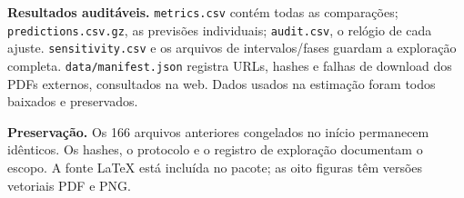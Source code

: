 \documentclass[11pt,a4paper]{article}
\begin{document}
\textbf{Resultados auditáveis.} \texttt{metrics.csv} contém todas as comparações; \texttt{predictions.csv.gz}, as previsões individuais; \texttt{audit.csv}, o relógio de cada ajuste. \texttt{sensitivity.csv} e os arquivos de intervalos/fases guardam a exploração completa. \texttt{data/manifest.json} registra URLs, hashes e falhas de download dos PDFs externos, consultados na web. Dados usados na estimação foram todos baixados e preservados.

\textbf{Preservação.} Os 166 arquivos anteriores congelados no início permanecem idênticos. Os hashes, o protocolo e o registro de exploração documentam o escopo. A fonte LaTeX está incluída no pacote; as oito figuras têm versões vetoriais PDF e PNG.
\end{document}
